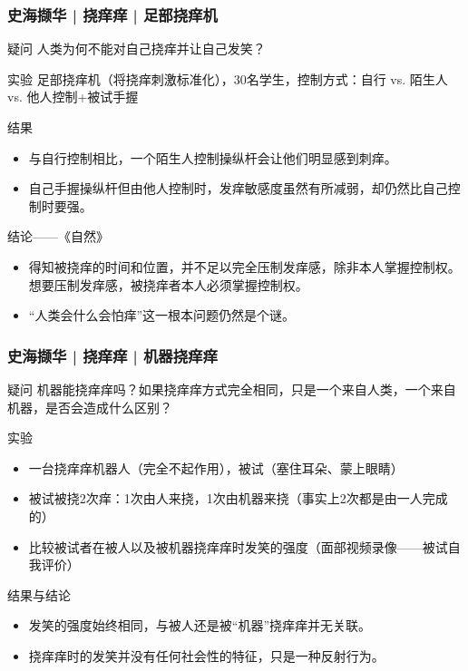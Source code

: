 \begin{frame}
  \frametitle{史海撷华 | 挠痒痒 | 足部挠痒机}
  \begin{block}{疑问}
    人类为何不能对自己挠痒并让自己发笑？
  \end{block}
  \vspace{-0.5em}
  \pause
  \begin{block}{实验}
      足部挠痒机（将挠痒刺激标准化），30名学生，控制方式：自行 vs. 陌生人 vs. 他人控制+被试手握
  \end{block}
  \vspace{-0.5em}
  \pause
  \begin{block}{结果}
    \begin{itemize}
      \item 与自行控制相比，一个陌生人控制操纵杆会让他们明显感到刺痒。
      \item 自己手握操纵杆但由他人控制时，发痒敏感度虽然有所减弱，却仍然比自己控制时要强。
    \end{itemize}
  \end{block}
  \vspace{-0.5em}
  \pause
  \begin{block}{结论——《自然》}
    \begin{itemize}
      \item 得知被挠痒的时间和位置，并不足以完全压制发痒感，除非本人掌握控制权。想要压制发痒感，被挠痒者本人必须掌握控制权。
      \item “人类会什么会怕痒”这一根本问题仍然是个谜。
    \end{itemize}
  \end{block}
\end{frame}

\begin{frame}
  \frametitle{史海撷华 | 挠痒痒 | 机器挠痒痒}
  \begin{block}{疑问}
    机器能挠痒痒吗？如果挠痒痒方式完全相同，只是一个来自人类，一个来自机器，是否会造成什么区别？
  \end{block}
  \pause
  \begin{block}{实验}
    \begin{itemize}
      \item 一台挠痒痒机器人（完全不起作用），被试（塞住耳朵、蒙上眼睛）
      \item 被试被挠2次痒：1次由人来挠，1次由机器来挠（事实上2次都是由一人完成的）
      \item 比较被试者在被人以及被机器挠痒痒时发笑的强度（面部视频录像——被试自我评价）
    \end{itemize}
  \end{block}
  \pause
  \begin{block}{结果与结论}
    \begin{itemize}
      \item 发笑的强度始终相同，与被人还是被“机器”挠痒痒并无关联。
      \item 挠痒痒时的发笑并没有任何社会性的特征，只是一种反射行为。
    \end{itemize}
  \end{block}
\end{frame}

